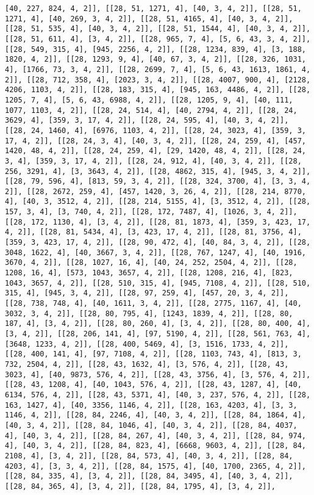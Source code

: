 \documentclass[12pt,fleqn]{article}\usepackage{../../common}
\begin{document}
\begin{verbatim}
[40, 227, 824, 4, 2]], [[28, 51, 1271, 4], [40, 3, 4, 2]], [[28, 51, 1271, 4], [40, 269, 3, 4, 2]], [[28, 51, 4165, 4], [40, 3, 4, 2]], [[28, 51, 535, 4], [40, 3, 4, 2]], [[28, 51, 1544, 4], [40, 3, 4, 2]], [[28, 51, 611, 4], [3, 4, 2]], [[28, 965, 7, 4], [5, 6, 43, 3, 4, 2]], [[28, 549, 315, 4], [945, 2256, 4, 2]], [[28, 1234, 839, 4], [3, 188, 1820, 4, 2]], [[28, 1293, 9, 4], [40, 67, 3, 4, 2]], [[28, 326, 1031, 4], [1766, 73, 3, 4, 2]], [[28, 2699, 7, 4], [5, 6, 43, 1613, 1861, 4, 2]], [[28, 712, 358, 4], [2023, 3, 4, 2]], [[28, 4007, 900, 4], [2128, 4206, 1103, 4, 2]], [[28, 183, 315, 4], [945, 163, 4486, 4, 2]], [[28, 1205, 7, 4], [5, 6, 43, 6988, 4, 2]], [[28, 1205, 9, 4], [40, 111, 1077, 1103, 4, 2]], [[28, 24, 514, 4], [40, 2794, 4, 2]], [[28, 24, 3629, 4], [359, 3, 17, 4, 2]], [[28, 24, 595, 4], [40, 3, 4, 2]], [[28, 24, 1460, 4], [6976, 1103, 4, 2]], [[28, 24, 3023, 4], [359, 3, 17, 4, 2]], [[28, 24, 3, 4], [40, 3, 4, 2]], [[28, 24, 259, 4], [457, 1420, 48, 4, 2]], [[28, 24, 259, 4], [29, 1420, 48, 4, 2]], [[28, 24, 3, 4], [359, 3, 17, 4, 2]], [[28, 24, 912, 4], [40, 3, 4, 2]], [[28, 256, 3291, 4], [3, 3643, 4, 2]], [[28, 4862, 315, 4], [945, 3, 4, 2]], [[28, 79, 596, 4], [813, 59, 3, 4, 2]], [[28, 324, 3700, 4], [3, 3, 4, 2]], [[28, 2672, 259, 4], [457, 1420, 3, 26, 4, 2]], [[28, 214, 8770, 4], [40, 3, 3512, 4, 2]], [[28, 214, 5155, 4], [3, 3512, 4, 2]], [[28, 157, 3, 4], [3, 740, 4, 2]], [[28, 172, 7487, 4], [1026, 3, 4, 2]], [[28, 172, 1130, 4], [3, 4, 2]], [[28, 81, 1873, 4], [359, 3, 423, 17, 4, 2]], [[28, 81, 5434, 4], [3, 423, 17, 4, 2]], [[28, 81, 3756, 4], [359, 3, 423, 17, 4, 2]], [[28, 90, 472, 4], [40, 84, 3, 4, 2]], [[28, 3048, 1622, 4], [40, 3667, 3, 4, 2]], [[28, 767, 1247, 4], [40, 1916, 3670, 4, 2]], [[28, 1027, 16, 4], [40, 24, 252, 2504, 4, 2]], [[28, 1208, 16, 4], [573, 1043, 3657, 4, 2]], [[28, 1208, 216, 4], [823, 1043, 3657, 4, 2]], [[28, 510, 315, 4], [945, 7108, 4, 2]], [[28, 510, 315, 4], [945, 3, 4, 2]], [[28, 97, 259, 4], [457, 20, 3, 4, 2]], [[28, 738, 748, 4], [40, 1611, 3, 4, 2]], [[28, 2775, 1167, 4], [40, 3032, 3, 4, 2]], [[28, 80, 795, 4], [1243, 1839, 4, 2]], [[28, 80, 187, 4], [3, 4, 2]], [[28, 80, 260, 4], [3, 4, 2]], [[28, 80, 400, 4], [3, 4, 2]], [[28, 206, 141, 4], [97, 5190, 4, 2]], [[28, 561, 763, 4], [3648, 1233, 4, 2]], [[28, 400, 5469, 4], [3, 1516, 1733, 4, 2]], [[28, 400, 141, 4], [97, 7108, 4, 2]], [[28, 1103, 743, 4], [813, 3, 732, 2504, 4, 2]], [[28, 43, 1632, 4], [3, 576, 4, 2]], [[28, 43, 3023, 4], [40, 9873, 576, 4, 2]], [[28, 43, 3756, 4], [3, 576, 4, 2]], [[28, 43, 1208, 4], [40, 1043, 576, 4, 2]], [[28, 43, 1287, 4], [40, 6134, 576, 4, 2]], [[28, 43, 5371, 4], [40, 3, 237, 576, 4, 2]], [[28, 163, 1427, 4], [40, 3356, 1146, 4, 2]], [[28, 163, 4203, 4], [3, 3, 1146, 4, 2]], [[28, 84, 2246, 4], [40, 3, 4, 2]], [[28, 84, 1864, 4], [40, 3, 4, 2]], [[28, 84, 1046, 4], [40, 3, 4, 2]], [[28, 84, 4037, 4], [40, 3, 4, 2]], [[28, 84, 267, 4], [40, 3, 4, 2]], [[28, 84, 974, 4], [40, 3, 4, 2]], [[28, 84, 823, 4], [6668, 9603, 4, 2]], [[28, 84, 2108, 4], [3, 4, 2]], [[28, 84, 573, 4], [40, 3, 4, 2]], [[28, 84, 4203, 4], [3, 3, 4, 2]], [[28, 84, 1575, 4], [40, 1700, 2365, 4, 2]], [[28, 84, 335, 4], [3, 4, 2]], [[28, 84, 3495, 4], [40, 3, 4, 2]], [[28, 84, 365, 4], [3, 4, 2]], [[28, 84, 1795, 4], [3, 4, 2]], 
\end{verbatim}
\end{document}
